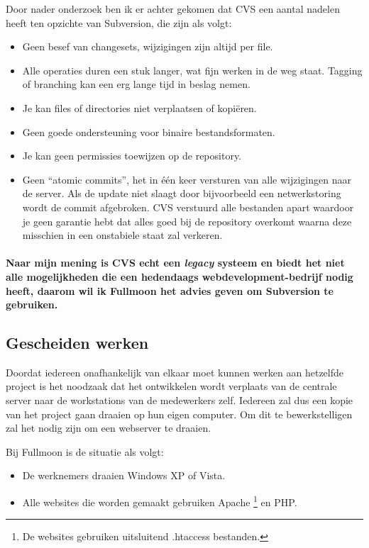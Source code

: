 \documentclass[12pt,a4paper]{article}
\begin{document}
    Door nader onderzoek ben ik er achter gekomen dat CVS een aantal nadelen heeft ten opzichte van Subversion, die zijn als volgt:
    
    \begin{itemize}
      \item Geen besef van changesets, wijzigingen zijn altijd per file.
      \item Alle operaties duren een stuk langer, wat fijn werken in de weg staat. Tagging of branching kan een erg lange tijd in beslag nemen.
      \item Je kan files of directories niet verplaatsen of kopi\"{e}ren.
      \item Geen goede ondersteuning voor binaire bestandsformaten.
      \item Je kan geen permissies toewijzen op de repository.
      \item Geen ``atomic commits'', het in \'{e}\'{e}n keer versturen van alle wijzigingen naar de server. Als de update niet slaagt door bijvoorbeeld een netwerkstoring wordt de commit afgebroken. CVS verstuurd alle bestanden apart waardoor je geen garantie hebt dat alles goed bij de repository overkomt waarna deze misschien in een onstabiele staat zal verkeren.
    \end{itemize}
    
    \paragraph{Naar mijn mening is CVS echt een \emph{legacy} systeem en biedt het niet alle mogelijkheden die een hedendaags webdevelopment-bedrijf nodig heeft, daarom wil ik Fullmoon het advies geven om Subversion te gebruiken.}
    
    \subsection{Gescheiden werken}
    
    Doordat iedereen onafhankelijk van elkaar moet kunnen werken aan hetzelfde project is het noodzaak dat het ontwikkelen wordt verplaats van de centrale server naar de workstations van de medewerkers zelf. Iedereen zal dus een kopie van het project gaan draaien op hun eigen computer. Om dit te bewerkstelligen zal het nodig zijn om een webserver te draaien.
    
    Bij Fullmoon is de situatie als volgt:
    
    \begin{itemize}
      \item De werknemers draaien Windows XP of Vista.
      \item Alle websites die worden gemaakt gebruiken Apache \footnote{De websites gebruiken uitsluitend .htaccess bestanden.} en PHP.
    \end{itemize}
    
\end{document}
